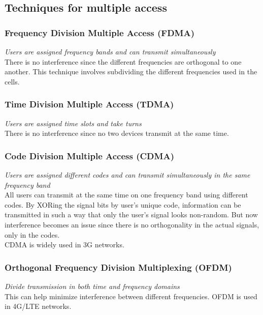 \documentclass{article}
\begin{document}
\subsection{Techniques for multiple access}

\subsubsection{Frequency Division Multiple Access (FDMA)}

\textit{Users are assigned frequency bands and can transmit simultaneously} \\
There is no interference since the different frequencies are orthogonal to one another. This technique involves subdividing the different frequencies used in the cells.

\subsubsection{Time Division Multiple Access (TDMA)}

\textit{Users are assigned time slots and take turns} \\
There is no interference since no two devices transmit at the same time.

\subsubsection{Code Division Multiple Access (CDMA)}

\textit{Users are assigned different codes and can transmit simultaneously in the same frequency band} \\
All users can transmit at the same time on one frequency band using different codes. By XORing the signal bits by user's unique code, information can be transmitted in such a way that only the user's signal looks non-random. But now interference becomes an issue since there is no orthogonality in the actual signals, only in the codes. \\
CDMA is widely used in 3G networks.

\subsubsection{Orthogonal Frequency Division Multiplexing (OFDM)}

\textit{Divide transmission in both time and frequency domains} \\
This can help minimize interference between different frequencies. OFDM is used in 4G/LTE networks. \\
\end{document}
